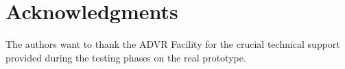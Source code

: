 \section*{Acknowledgments}
The authors want to thank the ADVR Facility for the crucial technical support provided during the testing phases on the real prototype. 